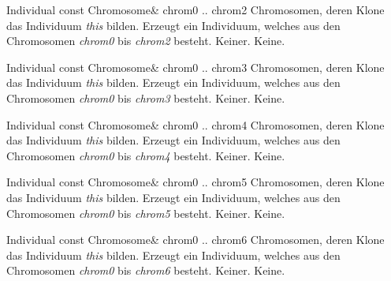 \documentclass{report}
\begin{document}
\newpage

\setNormalInstance
\printMethodWithOneParam
{}
{Individual}
{const Chromosome\&}
{chrom0 .. chrom2}
{Chromosomen, deren Klone das Individuum {\em this} bilden.}
{Erzeugt ein Individuum, welches aus den Chromosomen
 {\em chrom0} bis {\em chrom2} besteht.}
{Keiner.}
{Keine.}

\vspace{4ex}

\setNormalInstance
\printMethodWithOneParam
{}
{Individual}
{const Chromosome\&}
{chrom0 .. chrom3}
{Chromosomen, deren Klone das Individuum {\em this} bilden.}
{Erzeugt ein Individuum, welches aus den Chromosomen
 {\em chrom0} bis {\em chrom3} besteht.}
{Keiner.}
{Keine.}

\vspace{4ex}

\setNormalInstance
\printMethodWithOneParam
{}
{Individual}
{const Chromosome\&}
{chrom0 .. chrom4}
{Chromosomen, deren Klone das Individuum {\em this} bilden.}
{Erzeugt ein Individuum, welches aus den Chromosomen
 {\em chrom0} bis {\em chrom4} besteht.}
{Keiner.}
{Keine.}

\newpage

\setNormalInstance
\printMethodWithOneParam
{}
{Individual}
{const Chromosome\&}
{chrom0 .. chrom5}
{Chromosomen, deren Klone das Individuum {\em this} bilden.}
{Erzeugt ein Individuum, welches aus den Chromosomen
 {\em chrom0} bis {\em chrom5} besteht.}
{Keiner.}
{Keine.}

\vspace{4ex}

\setNormalInstance
\printMethodWithOneParam
{}
{Individual}
{const Chromosome\&}
{chrom0 .. chrom6}
{Chromosomen, deren Klone das Individuum {\em this} bilden.}
{Erzeugt ein Individuum, welches aus den Chromosomen
 {\em chrom0} bis {\em chrom6} besteht.}
{Keiner.}
{Keine.}
\end{document}
